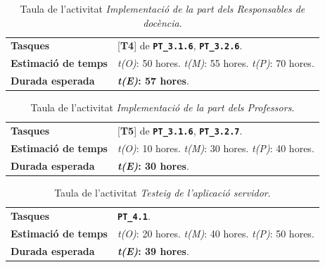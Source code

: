 \documentclass[a4paper,12pt]{ThesisStyle}
\begin{document}
\begin{table}[H]
  \begin{tabularx}{\textwidth}{l | X}
    \toprule
    \rowcolor{Blue}
    \multicolumn{2}{c}{\texttt{\textbf{A15:}} Implementació de la part dels Responsables de docència}\\
    \midrule[0.9pt]
    \textbf{Tasques}                 & [\textbf{T4}] de \texttt{\textbf{PT\_3.1.6}}, \texttt{\textbf{PT\_3.2.6}}.\\
    \midrule
    \textbf{Estimació de temps}      & \textit{t(O)}: 50 hores.
    \newline \textit{t(M)}: 55 hores.
    \newline \textit{t(P)}: 70 hores.\\
    \midrule
    \textbf{Durada esperada}         & \textbf{\textit{t(E)}: 57 hores}.\\
    \bottomrule
  \end{tabularx}
  \caption{\label{taula:a15} Taula de l'activitat \emph{Implementació de la part dels Responsables de docència}.}
\end{table}

\begin{table}[H]
  \begin{tabularx}{\textwidth}{l | X}
    \toprule
    \rowcolor{Blue}
    \multicolumn{2}{c}{\texttt{\textbf{A16:}} Implementació de la part dels Professors}\\
    \midrule[0.9pt]
    \textbf{Tasques}                 & [\textbf{T5}] de \texttt{\textbf{PT\_3.1.6}}, \texttt{\textbf{PT\_3.2.7}}.\\
    \midrule
    \textbf{Estimació de temps}      & \textit{t(O)}: 10 hores.
    \newline \textit{t(M)}: 30 hores.
    \newline \textit{t(P)}: 40 hores.\\
    \midrule
    \textbf{Durada esperada}         & \textbf{\textit{t(E)}: 30 hores}.\\
    \bottomrule
  \end{tabularx}
  \caption{\label{taula:a16} Taula de l'activitat \emph{Implementació de la part dels Professors}.}
\end{table}

\begin{table}[H]
  \begin{tabularx}{\textwidth}{l | X}
    \toprule
    \rowcolor{Orange}
    \multicolumn{2}{c}{\texttt{\textbf{A17:}} Testeig de l'aplicació servidor}\\
    \midrule[0.9pt]
    \textbf{Tasques}                 & \texttt{\textbf{PT\_4.1}}.\\
    \midrule
    \textbf{Estimació de temps}      & \textit{t(O)}: 20 hores.
    \newline \textit{t(M)}: 40 hores.
    \newline \textit{t(P)}: 50 hores.\\
    \midrule
    \textbf{Durada esperada}         & \textbf{\textit{t(E)}: 39 hores}.\\
    \bottomrule
  \end{tabularx}
  \caption{\label{taula:a17} Taula de l'activitat \emph{Testeig de l'aplicació servidor}.}
\end{table}
\end{document}
